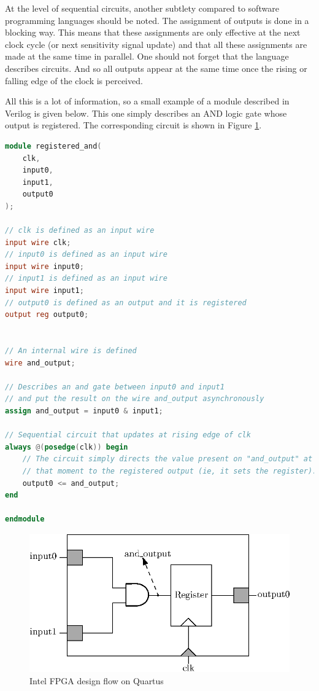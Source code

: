 At the level of sequential circuits, another subtlety compared to software programming languages 
should be noted. The assignment of outputs is done in a blocking way. This means that these 
assignments are only effective at the next clock cycle (or next sensitivity signal update) and 
that all these assignments are made at the same time in parallel. One should not forget that the 
language describes circuits. And so all outputs appear at the same time once the rising or falling 
edge of the clock is perceived.

All this is a lot of information, so a small example of a module described in Verilog is given 
below. This one simply describes an AND logic gate whose output is registered. The corresponding 
circuit is shown in Figure \ref{fig:verilog/register_and}.

\begin{lstlisting}[language=Verilog, caption=Verilog Registered AND gate example]
module registered_and(
    clk,
    input0,
    input1,
    output0
);

// clk is defined as an input wire 
input wire clk;   
// input0 is defined as an input wire  
input wire input0;  
// input1 is defined as an input wire
input wire input1; 
// output0 is defined as an output and it is registered
output reg output0; 


// An internal wire is defined
wire and_output;    

// Describes an and gate between input0 and input1
// and put the result on the wire and_output asynchronously
assign and_output = input0 & input1; 

// Sequential circuit that updates at rising edge of clk
always @(posedge(clk)) begin
    // The circuit simply directs the value present on "and_output" at 
    // that moment to the registered output (ie, it sets the register).
    output0 <= and_output;                      
end

endmodule

\end{lstlisting}

\begin{figure}[H]
    \centering
    \includegraphics[scale=1.0]{Chapter2-FPGA_Flow/res/register_and}
    \caption{Intel FPGA design flow on Quartus}
    \label{fig:verilog/register_and}
\end{figure}


